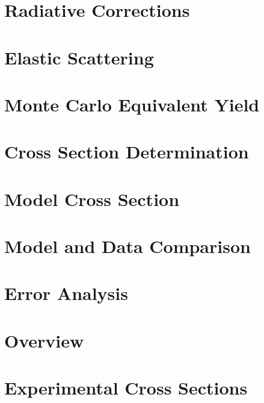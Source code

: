 \documentclass[
]{report}
\begin{document}
\hypertarget{Section-6.6}{%
\section{Radiative Corrections}\label{Section-6.6}}

\hypertarget{Section-6.7}{%
\section{Elastic Scattering}\label{Section-6.7}}

\label{Chapter-7}

\hypertarget{Section-7.1}{%
\section{Monte Carlo Equivalent Yield}\label{Section-7.1}}

\hypertarget{Section-7.2}{%
\section{Cross Section Determination}\label{Section-7.2}}

\hypertarget{Section-7.3}{%
\section{Model Cross Section}\label{Section-7.3}}

\hypertarget{Section-7.4}{%
\section{Model and Data Comparison}\label{Section-7.4}}

\hypertarget{Section-7.5}{%
\section{Error Analysis}\label{Section-7.5}}

\label{Chapter-8}

\hypertarget{Section-8.1}{%
\section{Overview}\label{Section-8.1}}

\hypertarget{Section-8.2}{%
\section{Experimental Cross Sections}\label{Section-8.2}}
\end{document}
